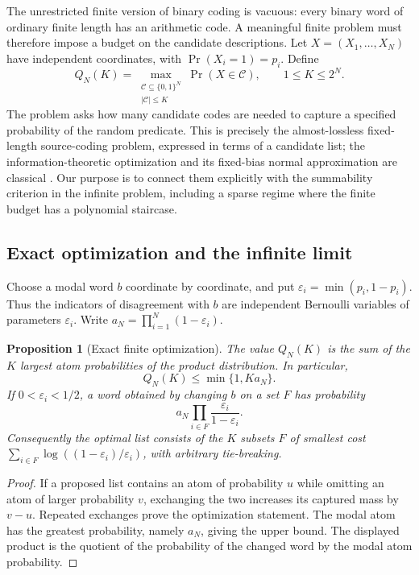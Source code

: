 \documentclass[11pt]{article}
\numberwithin{equation}{section}
\newtheorem{proposition}[theorem]{Proposition}
\theoremstyle{definition}
\theoremstyle{remark}
\begin{document}
The unrestricted finite version of binary coding is vacuous: every binary
word of ordinary finite length has an arithmetic code.  A meaningful finite
problem must therefore impose a budget on the candidate descriptions.  Let
$X=(X_1,\ldots,X_N)$ have independent coordinates, with
$\Pr(X_i=1)=p_i$.  Define
\[
 Q_N(K)=\max_{\substack{\mathcal C\subseteq\{0,1\}^N\\
                         |\mathcal C|\le K}}
          \Pr(X\in\mathcal C),\qquad 1\le K\le 2^N.
\]
The problem asks how many candidate codes are needed to capture a specified
probability of the random predicate.  This is precisely the almost-lossless
fixed-length source-coding problem, expressed in terms of a candidate list;
the information-theoretic optimization and its fixed-bias normal
approximation are classical \cite{kontoyiannis-verdu,chen-effros-kostina}.  Our purpose is to connect them explicitly
with the summability criterion in the infinite problem, including a sparse
regime where the finite budget has a polynomial staircase.

\subsection{Exact optimization and the infinite limit}

Choose a modal word $b$ coordinate by coordinate, and put
$\varepsilon_i=\min(p_i,1-p_i)$.  Thus the indicators of disagreement with
$b$ are independent Bernoulli variables of parameters $\varepsilon_i$.
Write $a_N=\prod_{i=1}^N(1-\varepsilon_i)$.

\begin{proposition}[Exact finite optimization]
\label{rbc:prop:budget-exact}
The value $Q_N(K)$ is the sum of the $K$ largest atom probabilities of the
product distribution.  In particular,
\[
 Q_N(K)\le \min\{1,K a_N\}.
\]
If $0<\varepsilon_i<1/2$, a word obtained by changing $b$ on a set $F$ has
probability
\[
 a_N\prod_{i\in F}\frac{\varepsilon_i}{1-\varepsilon_i}.
\]
Consequently the optimal list consists of the $K$ subsets $F$ of smallest
cost $\sum_{i\in F}\log((1-\varepsilon_i)/\varepsilon_i)$, with arbitrary
tie-breaking.
\end{proposition}

\begin{proof}
If a proposed list contains an atom of probability $u$ while omitting an
atom of larger probability $v$, exchanging the two increases its captured
mass by $v-u$.  Repeated exchanges prove the optimization statement.
The modal atom has the greatest probability, namely $a_N$, giving the
upper bound.  The displayed product is the quotient of the probability
of the changed word by the modal atom probability.
\end{proof}
\end{document}
